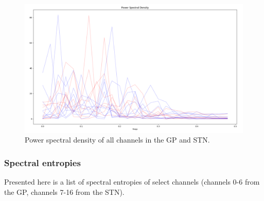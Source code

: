 \documentclass{article}
\begin{document}
\begin{figure}[H]
    \centering
    \centerline{\includegraphics[width=1\textwidth]{images/spiking/powerSpect_all.png}}
    \caption{Power spectral density of all channels in the GP and STN.}
    \label{fig:PS3}
\end{figure}

\subsubsection{Spectral entropies}

Presented here is a list of spectral entropies of select channels (channels 0-6 from the GP, channels 7-16 from the STN).
\end{document}

